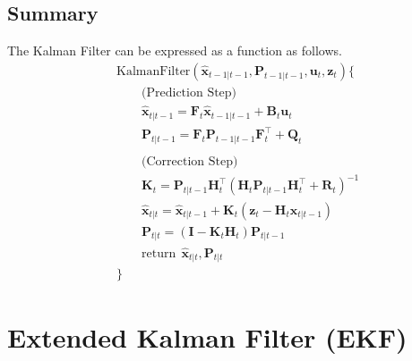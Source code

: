 \documentclass[10pt]{article}
\begin{document}
	\subsection{Summary}
	The Kalman Filter can be expressed as a function as follows. 
	\begin{equation} 
		\boxed{ \begin{aligned} 
				& \text{KalmanFilter}(\hat{\mathbf{x}}_{t-1|t-1}, \mathbf{P}_{t-1|t-1}, \mathbf{u}_{t}, \mathbf{z}_{t}) \{ \\ 
				& \quad\quad \text{(Prediction Step)}\\ 
				& \quad\quad \hat{\mathbf{x}}_{t|t-1} = \mathbf{F}_{t}\hat{\mathbf{x}}_{t-1|t-1} + \mathbf{B}_{t}\mathbf{u}_{t} \\ 
				& \quad\quad \mathbf{P}_{t|t-1} = \mathbf{F}_{t}\mathbf{P}_{t-1|t-1}\mathbf{F}_{t}^{\intercal} + \mathbf{Q}_{t} \\ 
				& \\ 
				& \quad\quad \text{(Correction Step)} \\ 
				& \quad\quad \mathbf{K}_{t} = \mathbf{P}_{t|t-1}\mathbf{H}_{t}^{\intercal}(\mathbf{H}_{t}\mathbf{P}_{t|t-1}\mathbf{H}_{t}^{\intercal} + \mathbf{R}_{t})^{-1} \\ 
				& \quad\quad \hat{\mathbf{x}}_{t|t} = \hat{\mathbf{x}}_{t|t-1} + \mathbf{K}_{t}( \mathbf{z}_{t} - \mathbf{H}_{t}\hat{\mathbf{x}}_{t|t-1}) \\ 
				& \quad\quad \mathbf{P}_{t|t} = (\mathbf{I} - \mathbf{K}_{t}\mathbf{H}_{t})\mathbf{P}_{t|t-1} \\ 
				& \quad\quad \text{return} \ \ \hat{\mathbf{x}}_{t|t}, \mathbf{P}_{t|t} \\ 
				&   \} 
		\end{aligned} }
	\end{equation}
	
	
	
\section{Extended Kalman Filter (EKF)}
\end{document}
